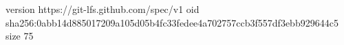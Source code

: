 version https://git-lfs.github.com/spec/v1
oid sha256:0abb14d885017209a105d05b4fc33fedee4a702757ccb3f557df3ebb929644c5
size 75
